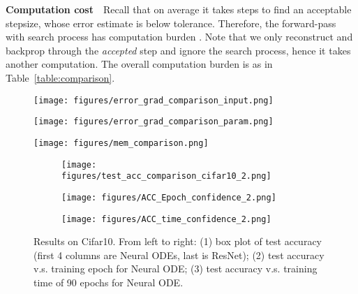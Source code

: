 \documentclass{article} \usepackage{iclr2021_conference,times}
\begin{document}
\textbf{Computation cost}\ \ Recall that on average it takes  steps to find an acceptable stepsize, whose error estimate is below tolerance. Therefore, the forward-pass with search process has computation burden . Note that we only reconstruct and backprop through the \textit{accepted} step and ignore the search process, hence it takes another  computation. The overall computation burden is  as in Table~\ref{table:comparison}.
\begin{figure*}
\centering
    \begin{minipage}{0.32\textwidth}
    \centering
        \texttt{[image: figures/error\_grad\_comparison\_input.png]}
\label{fig:grad_input}
    \end{minipage}
    \begin{minipage}{0.32\textwidth}
    \centering
        \texttt{[image: figures/error\_grad\_comparison\_param.png]}
\label{fig:grad_param}
    \end{minipage}
    \begin{minipage}{0.32\textwidth}
    \centering
        \texttt{[image: figures/mem\_comparison.png]}
\label{fig:memory}
    \end{minipage}
    \vspace{-7mm}
    \label{fig:toy}
    \vspace{-2mm}
\end{figure*}
\begin{figure*}
\centering
\begin{subfigure}{0.35\textwidth}
\centering
\texttt{[image: figures/test\_acc\_comparison\_cifar10\_2.png]}
\end{subfigure}
\begin{subfigure}{0.31\textwidth}
\centering
\texttt{[image: figures/ACC\_Epoch\_confidence\_2.png]}
\end{subfigure}
\begin{subfigure}{0.31\textwidth}
\centering
\texttt{[image: figures/ACC\_time\_confidence\_2.png]}
\end{subfigure}
\vspace{-2mm}
\caption{\small {Results on Cifar10. From left to right: (1) box plot of test accuracy (first 4 columns are Neural ODEs, last is ResNet); (2) test accuracy  v.s. training epoch for Neural ODE; (3) test accuracy  v.s. training time of 90 epochs for Neural ODE.}}
\label{fig:cifar10}
\vspace{-3mm}
\end{figure*} 
\end{document}
